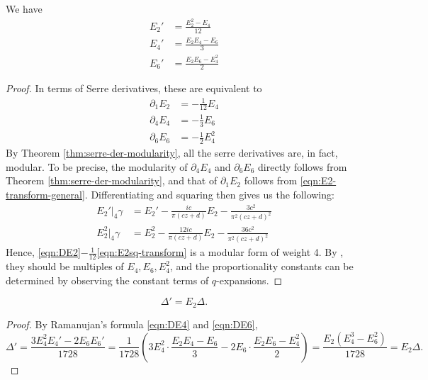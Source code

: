 \begin{theorem}\label{thm:ramanujan-formula}
We have
\begin{align}
    E_2' &= \frac{E_2^2 - E_4}{12} \label{eqn:DE2} \\
    E_4' &= \frac{E_2 E_4 - E_6}{3} \label{eqn:DE4} \\
    E_6' &= \frac{E_2 E_6 - E_4^2}{2} \label{eqn:DE6}
\end{align}
\end{theorem}
\begin{proof}
In terms of Serre derivatives, these are equivalent to
\begin{align}
    \partial_{1}E_2 &= -\frac{1}{12} E_4 \label{eqn:SE2} \\
    \partial_{4}E_4 &= -\frac{1}{3} E_6 \label{eqn:SE4} \\
    \partial_{6}E_6 &= -\frac{1}{2} E_4^2 \label{eqn:SE6}
\end{align}
By Theorem \ref{thm:serre-der-modularity}, all the serre derivatives are, in fact, modular.
To be precise, the modularity of $\partial_{4} E_4$ and $\partial_6 E_6$ directly follows from Theorem \ref{thm:serre-der-modularity}, and that of $\partial_{1}E_2$ follows from \eqref{eqn:E2-transform-general}.
Differentiating and squaring then gives us the following:
\begin{align}
    E_2'|_{4}\gamma &= E_2' - \frac{ic}{\pi(cz + d)} E_2 - \frac{3c^2}{\pi^2 (cz + d)^2} \label{eqn:DE2-transform} \\
    E_2^2|_{4}\gamma &= E_2^2 - \frac{12ic}{\pi(cz + d)} E_2 - \frac{36c^2}{\pi^2 (cz + d)^2} \label{eqn:E2sq-transform}
\end{align}
Hence, \eqref{eqn:DE2}$-\frac{1}{12}$\eqref{eqn:E2sq-transform} is a modular form of weight 4.
By , they should be multiples of $E_4, E_6, E_4^2$, and the proportionality constants can be determined by observing the constant terms of $q$-expansions.
\end{proof}
\begin{corollary}\label{cor:logder-disc-E2}
\begin{equation}\label{eqn:logder-disc-E2}
    \Delta' = E_2 \Delta.
\end{equation}
\end{corollary}
\begin{proof}
By Ramanujan's formula \eqref{eqn:DE4} and \eqref{eqn:DE6},
\begin{equation}
\Delta' = \frac{3 E_4^2 E_4' - 2 E_6 E_6'}{1728} = \frac{1}{1728} \left(3 E_4^2 \cdot \frac{E_2 E_4 - E_6}{3} - 2 E_6 \cdot \frac{E_2 E_6 - E_4^2}{2}\right) = \frac{E_2(E_4^3 - E_6^2)}{1728} = E_2\Delta.
\end{equation}
\end{proof}


